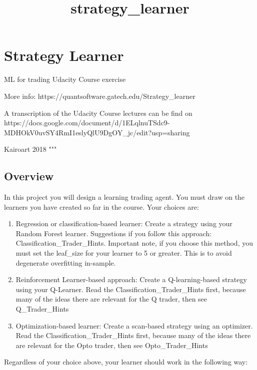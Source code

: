\documentclass[11pt]{article}
\title{strategy\_learner}
\providecommand{\tightlist}{%
      \setlength{\itemsep}{0pt}\setlength{\parskip}{0pt}}
\begin{document}
    
    
    \maketitle
    
    

    
    \section{Strategy Learner}\label{strategy-learner}

ML for trading Udacity Course exercise

More info: https://quantsoftware.gatech.edu/Strategy\_learner

A transcription of the Udacity Course lectures can be find on
https://docs.google.com/document/d/1ELqlnuTSdc9-MDHOkV0uvSY4RmI1eslyQlU9DgOY\_jc/edit?usp=sharing

Kairoart 2018 """

    \subsection{Overview}\label{overview}

In this project you will design a learning trading agent. You must draw
on the learners you have created so far in the course. Your choices are:

\begin{enumerate}
\def\labelenumi{\arabic{enumi}.}
\tightlist
\item
  Regression or classification-based learner: Create a strategy using
  your Random Forest learner. Suggestions if you follow this approach:
  Classification\_Trader\_Hints. Important note, if you choose this
  method, you must set the leaf\_size for your learner to 5 or greater.
  This is to avoid degenerate overfitting in-sample.
\item
  Reinforcement Learner-based approach: Create a Q-learning-based
  strategy using your Q-Learner. Read the Classification\_Trader\_Hints
  first, because many of the ideas there are relevant for the Q trader,
  then see Q\_Trader\_Hints
\item
  Optimization-based learner: Create a scan-based strategy using an
  optimizer. Read the Classification\_Trader\_Hints first, because many
  of the ideas there are relevant for the Opto trader, then see
  Opto\_Trader\_Hints
\end{enumerate}

Regardless of your choice above, your learner should work in the
following way:
\end{document}
